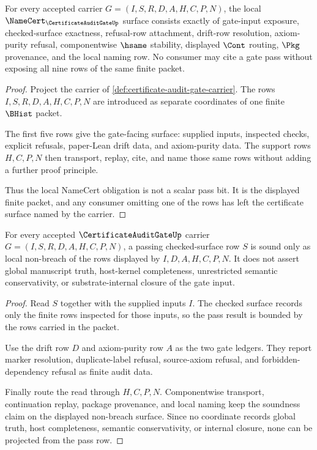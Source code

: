 \begin{theorem}
\label{thm:certificate-audit-gate-obligation-surface}
For every accepted carrier $G=(I,S,R,D,A,H,C,P,N)$, the local $\NameCert_{\CertificateAuditGateUp}$ surface consists exactly of gate-input exposure, checked-surface exactness, refusal-row attachment, drift-row resolution, axiom-purity refusal, componentwise $\hsame$ stability, displayed $\Cont$ routing, $\Pkg$ provenance, and the local naming row. No consumer may cite a gate pass without exposing all nine rows of the same finite packet.
\end{theorem}
\begin{proof}
Project the carrier of \autoref{def:certificate-audit-gate-carrier}. The rows $I,S,R,D,A,H,C,P,N$ are introduced as separate coordinates of one finite $\BHist$ packet.

The first five rows give the gate-facing surface: supplied inputs, inspected checks, explicit refusals, paper-Lean drift data, and axiom-purity data. The support rows $H,C,P,N$ then transport, replay, cite, and name those same rows without adding a further proof principle.

Thus the local NameCert obligation is not a scalar pass bit. It is the displayed finite packet, and any consumer omitting one of the rows has left the certificate surface named by the carrier.
\end{proof}

\begin{theorem}
\label{thm:certificate-audit-gate-soundness-boundary}
For every accepted $\CertificateAuditGateUp$ carrier $G=(I,S,R,D,A,H,C,P,N)$, a passing checked-surface row $S$ is sound only as local non-breach of the rows displayed by $I,D,A,H,C,P,N$. It does not assert global manuscript truth, host-kernel completeness, unrestricted semantic conservativity, or substrate-internal closure of the gate input.
\end{theorem}
\begin{proof}
Read $S$ together with the supplied inputs $I$. The checked surface records only the finite rows inspected for those inputs, so the pass result is bounded by the rows carried in the packet.

Use the drift row $D$ and axiom-purity row $A$ as the two gate ledgers. They report marker resolution, duplicate-label refusal, source-axiom refusal, and forbidden-dependency refusal as finite audit data.

Finally route the read through $H,C,P,N$. Componentwise transport, continuation replay, package provenance, and local naming keep the soundness claim on the displayed non-breach surface. Since no coordinate records global truth, host completeness, semantic conservativity, or internal closure, none can be projected from the pass row.
\end{proof}

